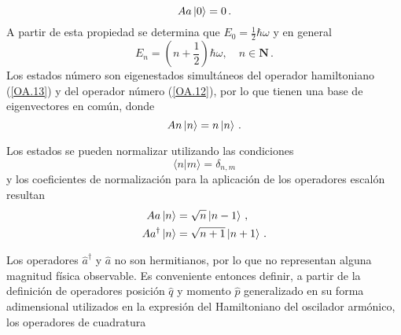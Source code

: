 \begin{equation}
\label{OA.17}
A{a}\ket{0} = 0\,.
\end{equation}
A partir de esta propiedad se determina que $E_0 = \frac{1}{2}\hbar\omega$ y en general
\begin{equation}
\label{OA.18}
E_n = \left( n + \frac{1}{2} \right) \hbar\omega, \quad n\in\mathbf{N}\,.
\end{equation}
Los estados número son eigenestados simultáneos del operador hamiltoniano (\ref{OA.13}) y del operador número (\ref{OA.12}), por lo que tienen una base de eigenvectores en común, donde
\begin{equation}
\label{OA.19}
A{n}\ket{n} = n\ket{n}\,.
\end{equation}

Los estados se pueden normalizar utilizando las condiciones
\begin{equation}
\label{OA.20}	
\langle n\vert m\rangle = \delta_{n,m}
\end{equation}
y los coeficientes de normalización para la aplicación de los operadores escalón resultan
\begin{align}
A{a}\ket{n} &= \sqrt{n} \ket{n-1} \,,\label{OA.21}\\
A{a}^{\dagger}\ket{n} &= \sqrt{n+1} \ket{n+1} \,.\label{OA.22}
\end{align}

Los operadores $\hat{a}^{\dagger}$ y $\hat{a}$ no son hermitianos, por lo que no representan alguna magnitud f\'isica observable. Es conveniente entonces definir, a partir de la definición de operadores posición $\hat{q}$ y momento $\hat{p}$ generalizado en su forma adimensional utilizados en la expresión del Hamiltoniano del oscilador armónico, los operadores de cuadratura

